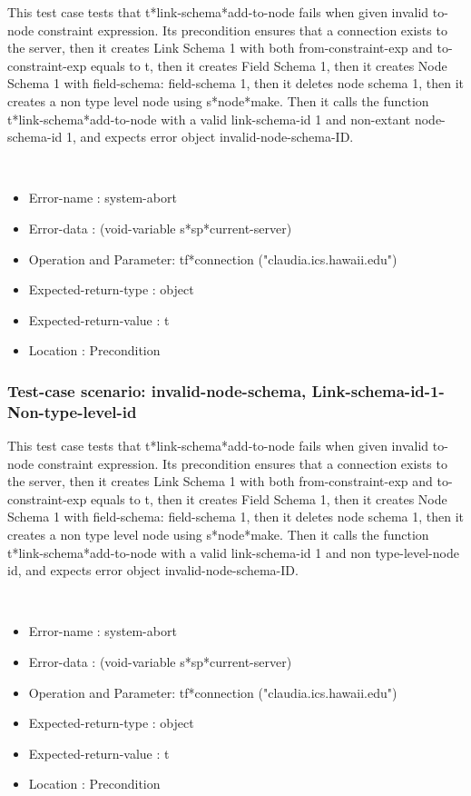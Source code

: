 This test case tests that t*link-schema*add-to-node fails when given invalid to-node constraint expression.
Its precondition ensures that a connection exists to the server, then it creates Link Schema 1 with both from-constraint-exp and to-constraint-exp equals to t, then it creates Field Schema 1, then it creates Node Schema 1 with field-schema: field-schema 1, then it deletes node schema 1, then it creates a non type level node using s*node*make.
Then it calls the function t*link-schema*add-to-node  with a valid link-schema-id 1 and non-extant node-schema-id 1, and expects error object invalid-node-schema-ID.



\
\begin {itemize}
\item 	Error-name             : system-abort
\item Error-data             : (void-variable s*sp*current-server)
\item Operation and Parameter: tf*connection ("claudia.ics.hawaii.edu")
\item Expected-return-type   : object
\item Expected-return-value  : t
\item Location               : Precondition



\end {itemize}
\subsubsection {Test-case scenario: invalid-node-schema, Link-schema-id-1-Non-type-level-id}


This test case tests that t*link-schema*add-to-node fails when given invalid to-node constraint expression.
Its precondition ensures that a connection exists to the server, then it creates Link Schema 1 with both from-constraint-exp and to-constraint-exp equals to t, then it creates Field Schema 1, then it creates Node Schema 1 with field-schema: field-schema 1, then it deletes node schema 1, then it creates a non type level node using s*node*make.
Then it calls the function t*link-schema*add-to-node  with a valid link-schema-id 1 and non type-level-node id, and expects error object invalid-node-schema-ID.



\
\begin {itemize}
\item 	Error-name             : system-abort
\item Error-data             : (void-variable s*sp*current-server)
\item Operation and Parameter: tf*connection ("claudia.ics.hawaii.edu")
\item Expected-return-type   : object
\item Expected-return-value  : t
\item Location               : Precondition



\end {itemize}
